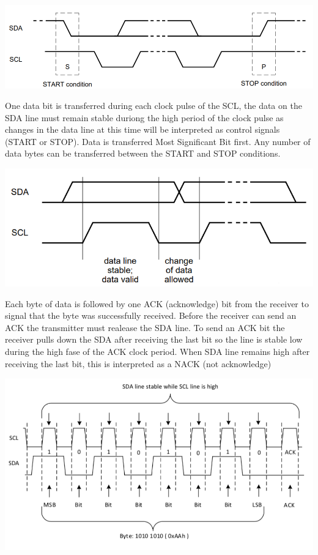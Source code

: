 \documentclass[]{article}
\begin{document}
\begin{center}
    \includegraphics[scale=0.5]{start_stop_conditions}
\end{center}
One data bit is transferred during each clock pulse of the SCL, the data on the SDA line must remain stable duriong the high period of the clock pulse
as changes in the data line at this time will be interpreted as control signals (START or STOP). Data is transferred Most Significant Bit first. 
Any number of data bytes can be transferred between the START and STOP conditions.

\begin{center}
    \includegraphics[scale=0.5]{bit_transfer}
\end{center}
Each byte of data is followed by one ACK (acknowledge) bit from the receiver to signal that the byte was successfully received. Before the receiver can send an ACK 
the transmitter must realease the SDA line. To send an ACK bit the receiver pulls down the SDA after receiving the last bit so the line is stable low during the high 
fase of the ACK clock period. When SDA line remains high after receiving the last bit, this is interpreted as a NACK (not acknowledge)

\begin{center}
    \includegraphics[scale=0.5]{byte_transmission}
\end{center}
\end{document}
